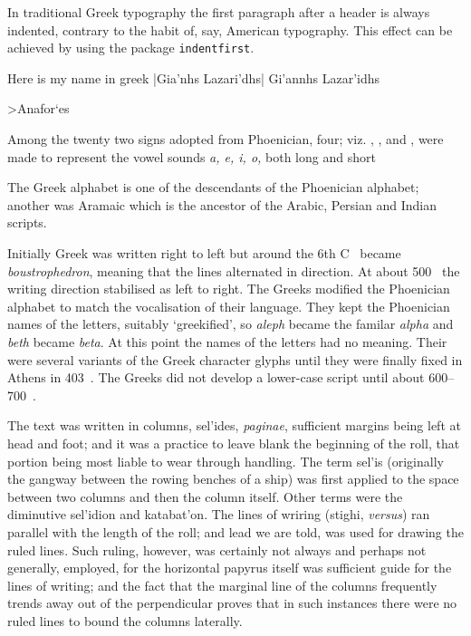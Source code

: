 \begin{multicols}{2}
In traditional Greek typography the first paragraph after a header is
always indented, contrary to the habit of, say, American typography. This
effect can be achieved by using the package \verb+indentfirst+.



Here is my name in greek  |\textgreek{Gia{'}nhs Lazari{'}dhs}|  \textgreek{Gi'annhs Lazar'idhs}

\textgreek{  }

\textgreek{>Anafor`es}

Among the twenty two signs adopted from Phoenician, four; viz.  ,  \textphnc{\ARyod}, and \textphnc{\ARayin}, were made to represent
the vowel sounds \textit{a, e, i, o,}  both long and short \textphnc{\ARrq\ARa\ARaleph}

    The Greek alphabet is one of the descendants of the Phoenician alphabet;
 another was Aramaic which is the ancestor of the Arabic, Persian and Indian 
 scripts.

 Initially Greek was written right to left but around the 6th C~\BC{} became 
 \textit{boustrophedron}, meaning that the lines 
 alternated in direction. At about 500~\BC{} the writing direction stabilised 
 as left to 
 right. The Greeks modified the Phoenician alphabet to match the vocalisation
 of their language. They kept the Phoenician names of the letters, suitably
 `greekified', so \textit{aleph} became the familar \textit{alpha} and 
 \textit{beth} became \textit{beta}. At this
 point the names of the letters had no meaning. Their were several variants
 of the Greek character glyphs until they were finally fixed in Athens in
 403~\BC.
 The Greeks did not develop a lower-case 
 script until about 600--700~\AD.

The text was written in columns, \textgreek{sel'ides}, \textit{paginae}, sufficient margins
being left at head and foot; and it was a practice to leave blank the beginning of the roll, that portion
being most liable to wear through handling. The term \textgreek{sel'is} (originally the gangway between the rowing benches of a ship) was first applied to the space between two columns and then the column itself. Other terms were the diminutive
\textgreek{sel'idion} and \textgreek{katabat'on}. The lines of wriring (stighi, \textit{versus}) ran parallel
with the length of the roll;  and lead we are told, was used for drawing the ruled lines. Such ruling, however, was certainly not
always and perhaps not generally, employed, for the horizontal papyrus itself was sufficient guide for the lines of writing; and the fact that the marginal line of the columns frequently trends away out of the perpendicular proves that in such instances there were no ruled lines to bound the columns laterally.


\end{multicols}
